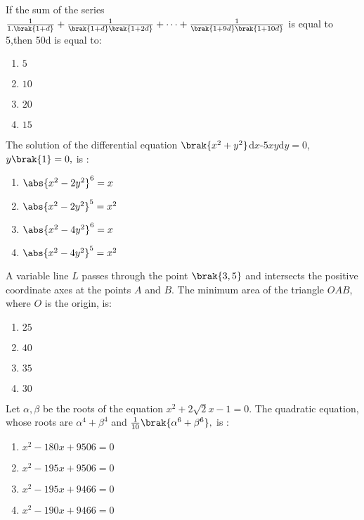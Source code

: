 \iffalse
\title{Assignment}
\author{AI24BTECH11020}
\section{mcq-single}
\fi


	\item If the sum of the series $\frac{1}{1.\brak{1+d}}+\frac{1}{\brak{1+d}\brak{1+2d}}+\cdots+\frac{1}{\brak{1+9d}\brak{1+10d}}$ is equal to 5,then 50d is equal to:   \hfill{}
     \begin{enumerate}
     \item $5$ \item $10$ \item $20$ \item $15$
     \end{enumerate}
\item The solution of the differential equation $\brak{x^2+y^2}$d$x$-$5xy$d$y=0$, $y\brak{1}=0,$ is :\hfill{}
      \begin{enumerate}
      \item $\abs{x^2-2y^2}^6=x$
      \item $\abs{x^2-2y^2}^5=x^2$
      \item $\abs{x^2-4y^2}^6=x$
      \item $\abs{x^2-4y^2}^5=x^2$
      \end{enumerate}
\item A variable line $L$ passes through the point $\brak{3,5}$ and intersects the positive coordinate axes at the points $A$ and $B$. The minimum area of the triangle $OAB$, where $O$ is the origin, is: \hfill{}
     \begin{enumerate}
     \item $25$ \item $40$ \item $35$ \item $30$
     \end{enumerate}
\item Let $\alpha ,\beta $ be the roots of the equation $x^2+2\sqrt{2}x-1=0.$ The quadratic equation, whose roots are $\alpha^4+\beta^4$ and $\frac{1}{10}\brak{\alpha^6+\beta^6},$ is : \hfill{}
     \begin{enumerate}
     \item $x^2-180x+9506=0$
     \item $x^2-195x+9506=0$
     \item $x^2-195x+9466=0$
     \item $x^2-190x+9466=0$
     \end{enumerate}
